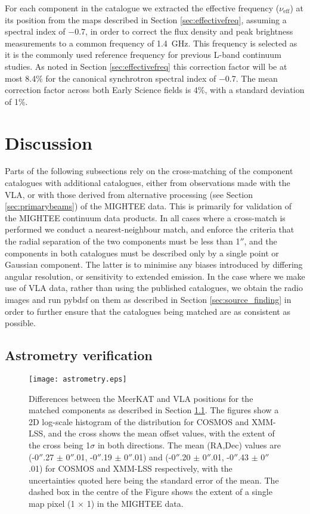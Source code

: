 \documentclass[usenatbib,usedcolumn]{mnras}
\begin{document}
For each component in the catalogue we extracted the effective frequency ($\nu_{\mathrm{eff}}$) at its position from the maps described in Section \ref{sec:effectivefreq}, assuming a spectral index of $-$0.7, in order to correct the flux density and peak brightness measurements to a common frequency of 1.4~GHz. This frequency is selected as it is the commonly used reference frequency for previous L-band continuum studies. As noted in Section \ref{sec:effectivefreq} this correction factor will be at most 8.4\% for the canonical synchrotron spectral index of $-$0.7. The mean correction factor across both Early Science fields is 4\%, with a standard deviation of 1\%.


\section{Discussion}
\label{sec:discussion}

Parts of the following subsections rely on the cross-matching of the component catalogues with additional catalogues, either from observations made with the VLA, or with those derived from alternative processing (see Section \ref{sec:primarybeams}) of the MIGHTEE data. This is primarily for validation of the MIGHTEE continuum data products. In all cases where a cross-match is performed we conduct a nearest-neighbour match, and enforce the criteria that the radial separation of the two components must be less than 1$''$, and the components in both catalogues must be described only by a single point or Gaussian component. The latter is to minimise any biases introduced by differing angular resolution, or sensitivity to extended emission. In the case where we make use of VLA data, rather than using the published catalogues, we obtain the radio images and run {\sc pybdsf} on them as described in Section \ref{sec:source_finding} in order to further ensure that the catalogues being matched are as consistent as possible.

\subsection{Astrometry verification}
\label{sec:astrometry}

\begin{figure}
 \texttt{[image: astrometry.eps]}
 \caption{Differences between the MeerKAT and VLA positions for the matched components as described in Section \ref{sec:astrometry}. The figures show a 2D log-scale histogram of the distribution for COSMOS and XMM-LSS, and the cross shows the mean offset values, with the extent of the cross being 1$\sigma$ in both directions. The mean (RA,Dec) values are (-0$''$.27 $\pm$ 0$''$.01, -0$''$.19 $\pm$ 0$''$.01) and (-0$''$.20 $\pm$ 0$''$.01, -0$''$.43 $\pm$ 0$''$.01) for COSMOS and XMM-LSS respectively, with the uncertainties quoted here being the standard error of the mean. The dashed box in the centre of the Figure shows the extent of a single map pixel (1 $\times$ 1) in the MIGHTEE data.}
 \label{fig:astrometry}
\end{figure}
\end{document}
